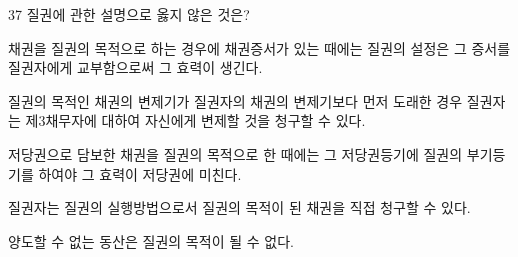 \begin{question}{37}
질권에 관한 설명으로 옳지 않은 것은?
\begin{choices}
  \item 채권을 질권의 목적으로 하는 경우에 채권증서가 있는 때에는 질권의 설정은 그 증서를 질권자에게 교부함으로써 그 효력이 생긴다.
  \item 질권의 목적인 채권의 변제기가 질권자의 채권의 변제기보다 먼저 도래한 경우 질권자는 제3채무자에 대하여 자신에게 변제할 것을 청구할 수 있다.
  \item 저당권으로 담보한 채권을 질권의 목적으로 한 때에는 그 저당권등기에 질권의 부기등기를 하여야 그 효력이 저당권에 미친다.
  \item 질권자는 질권의 실행방법으로서 질권의 목적이 된 채권을 직접 청구할 수 있다.
  \item 양도할 수 없는 동산은 질권의 목적이 될 수 없다.
\end{choices}
\end{question}
